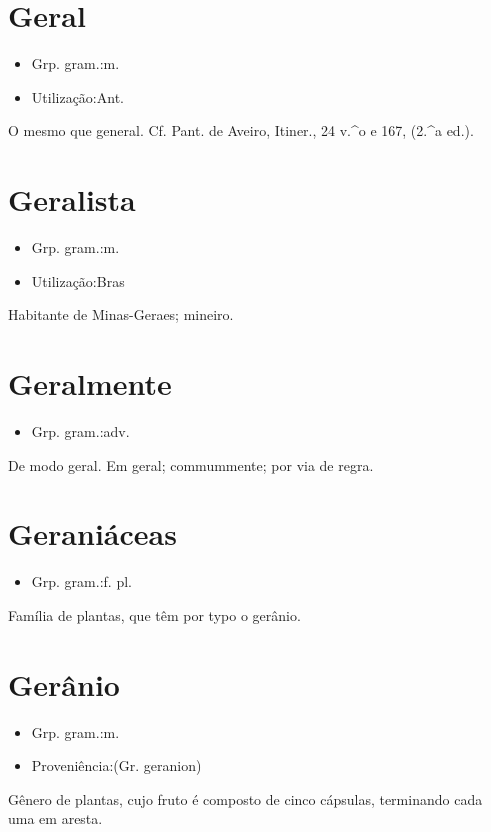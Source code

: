 \section{Geral}
\begin{itemize}
\item {Grp. gram.:m.}
\end{itemize}
\begin{itemize}
\item {Utilização:Ant.}
\end{itemize}
O mesmo que \textunderscore general\textunderscore . Cf. Pant. de Aveiro, \textunderscore Itiner.\textunderscore , 24 v.^o e 167, (2.^a ed.).
\section{Geralista}
\begin{itemize}
\item {Grp. gram.:m.}
\end{itemize}
\begin{itemize}
\item {Utilização:Bras}
\end{itemize}
Habitante de Minas-Geraes; mineiro.
\section{Geralmente}
\begin{itemize}
\item {Grp. gram.:adv.}
\end{itemize}
De modo geral.
Em geral; commummente; por via de regra.
\section{Geraniáceas}
\begin{itemize}
\item {Grp. gram.:f. pl.}
\end{itemize}
Família de plantas, que têm por typo o gerânio.
\section{Gerânio}
\begin{itemize}
\item {Grp. gram.:m.}
\end{itemize}
\begin{itemize}
\item {Proveniência:(Gr. \textunderscore geranion\textunderscore )}
\end{itemize}
Gênero de plantas, cujo fruto é composto de cinco cápsulas, terminando cada uma em aresta.

